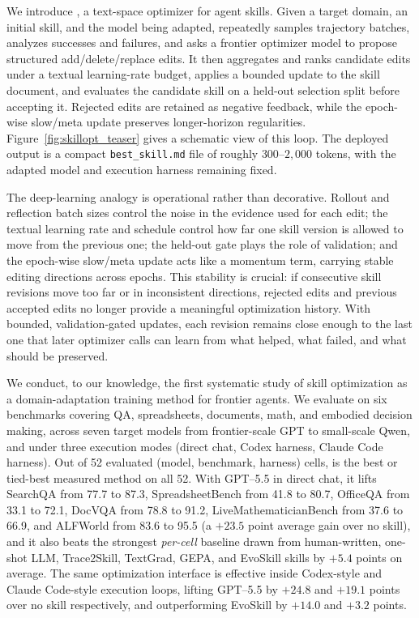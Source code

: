 We introduce \ourmethod{}, a text-space optimizer for agent skills. Given a target domain, an initial skill, and the model being adapted, \ourmethod{} repeatedly samples trajectory batches, analyzes successes and failures, and asks a frontier optimizer model to propose structured add/delete/replace edits. It then aggregates and ranks candidate edits under a textual learning-rate budget, applies a bounded update to the skill document, and evaluates the candidate skill on a held-out selection split before accepting it. Rejected edits are retained as negative feedback, while the epoch-wise slow/meta update preserves longer-horizon regularities. Figure~\ref{fig:skillopt_teaser} gives a schematic view of this loop. The deployed output is a compact \mbox{\texttt{best\_skill.md}} file of roughly $300$--$2{,}000$ tokens, with the adapted model and execution harness remaining fixed.

The deep-learning analogy is operational rather than decorative. Rollout and reflection batch sizes control the noise in the evidence used for each edit; the textual learning rate and schedule control how far one skill version is allowed to move from the previous one; the held-out gate plays the role of validation; and the epoch-wise slow/meta update acts like a momentum term, carrying stable editing directions across epochs. This stability is crucial: if consecutive skill revisions move too far or in inconsistent directions, rejected edits and previous accepted edits no longer provide a meaningful optimization history. With bounded, validation-gated updates, each revision remains close enough to the last one that later optimizer calls can learn from what helped, what failed, and what should be preserved.


We conduct, to our knowledge, the first systematic study of skill optimization as a domain-adaptation training method for frontier agents. We evaluate \ourmethod{} on six benchmarks covering QA, spreadsheets, documents, math, and embodied decision making, across seven target models from frontier-scale GPT to small-scale Qwen, and under three execution modes (direct chat, Codex harness, Claude Code harness). Out of 52 evaluated (model, benchmark, harness) cells, \ourmethod{} is the best or tied-best measured method on all 52. With GPT--5.5 in direct chat, it lifts SearchQA from 77.7 to 87.3, SpreadsheetBench from 41.8 to 80.7, OfficeQA from 33.1 to 72.1, DocVQA from 78.8 to 91.2, LiveMathematicianBench from 37.6 to 66.9, and ALFWorld from 83.6 to 95.5 (a $+23.5$ point average gain over no skill), and it also beats the strongest \emph{per-cell} baseline drawn from human-written, one-shot LLM, Trace2Skill, TextGrad, GEPA, and EvoSkill skills by $+5.4$ points on average. The same optimization interface is effective inside Codex-style and Claude Code-style execution loops, lifting GPT--5.5 by $+24.8$ and $+19.1$ points over no skill respectively, and outperforming EvoSkill by $+14.0$ and $+3.2$ points.

